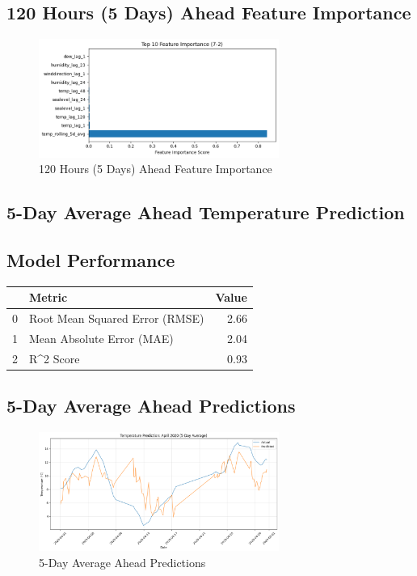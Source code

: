 \subsection{120 Hours (5 Days) Ahead Feature Importance}
\begin{figure}[htbp]
\centering
\includegraphics[width=0.7\textwidth]{7-2-random_forest_temp_feature_importance.png}
\caption{120 Hours (5 Days) Ahead Feature Importance}
\label{fig:120_hours_(5_days)_ahead_featimp}
\end{figure}



\subsection{5-Day Average Ahead Temperature Prediction}
\subsection{Model Performance}
\begin{tabular}{llr}
\toprule
 & Metric & Value \\
\midrule
0 & Root Mean Squared Error (RMSE) & 2.66 \\
1 & Mean Absolute Error (MAE) & 2.04 \\
2 & R^2 Score & 0.93 \\
\bottomrule
\end{tabular}

\subsection{5-Day Average Ahead Predictions}
\begin{figure}[htbp]
\centering
\includegraphics[width=0.7\textwidth]{7-3-random_forest_temp_prediction_results.png}
\caption{5-Day Average Ahead Predictions}
\label{fig:5-day_average_ahead_pred}
\end{figure}

